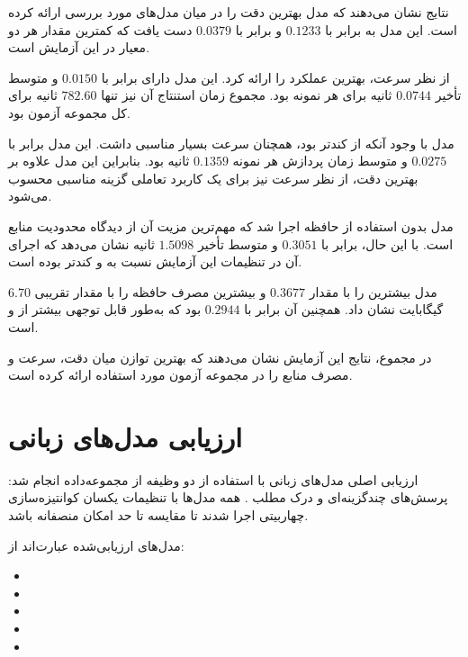 نتایج نشان می‌دهند که مدل
بهترین دقت را در میان مدل‌های مورد بررسی ارائه کرده است.
این مدل به
برابر با
$0.1233$
و
برابر با
$0.0379$
دست یافت که کمترین مقدار هر دو معیار در این آزمایش است.

از نظر سرعت،
بهترین عملکرد را ارائه کرد.
این مدل دارای
برابر با
$0.0150$
و متوسط تأخیر
$0.0744$
ثانیه برای هر نمونه بود.
مجموع زمان استنتاج آن نیز تنها
$782.60$
ثانیه برای کل مجموعه آزمون بود.

مدل
با وجود آنکه از  کندتر بود، همچنان سرعت بسیار مناسبی
داشت.
 این مدل برابر با
$0.0275$
و متوسط زمان پردازش هر نمونه
$0.1359$
ثانیه بود.
بنابراین این مدل علاوه بر بهترین دقت، از نظر سرعت نیز برای
یک کاربرد تعاملی گزینه مناسبی محسوب می‌شود.

مدل
بدون استفاده از حافظه  اجرا شد که مهم‌ترین مزیت آن از
دیدگاه محدودیت منابع است.
با این حال،  برابر با
$0.3051$
و متوسط تأخیر
$1.5098$
ثانیه نشان می‌دهد که اجرای آن در تنظیمات این آزمایش نسبت به
 و  کندتر بوده است.

مدل
بیشترین  را با مقدار
$0.3677$
و بیشترین مصرف حافظه  را با مقدار تقریبی
$6.70$
گیگابایت نشان داد.
همچنین  آن برابر با
$0.2944$
بود که به‌طور قابل توجهی بیشتر از  و 
است.

در مجموع، نتایج این آزمایش نشان می‌دهند که
 بهترین توازن میان دقت، سرعت و مصرف
منابع را در مجموعه آزمون مورد استفاده ارائه کرده است.
\section{ارزیابی مدل‌های زبانی}

ارزیابی اصلی مدل‌های زبانی با استفاده از دو وظیفه از مجموعه‌داده
 انجام شد: پرسش‌های چندگزینه‌ای و درک مطلب
. همه مدل‌ها با تنظیمات یکسان کوانتیزه‌سازی
چهاربیتی  اجرا شدند تا مقایسه تا حد امکان منصفانه باشد.

مدل‌های ارزیابی‌شده عبارت‌اند از:

\begin{itemize}
    \item {}
    \item {}
    \item {}
    \item {}
    \item {}
\end{itemize}

